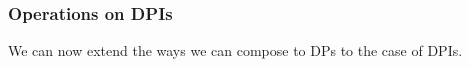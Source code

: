 \subsubsection{Operations on DPIs}




We can now extend the ways we can compose to DPs to the case of DPIs.



